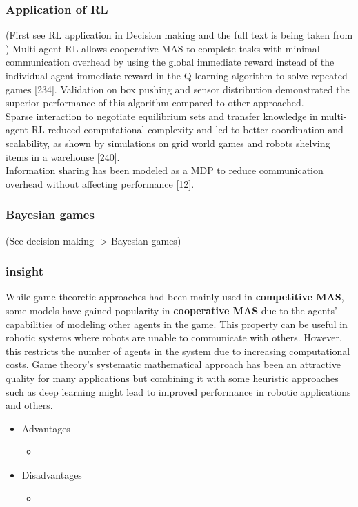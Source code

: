 \documentclass{article}
\begin{document}
			\subsubsection{Application of RL}
			(First see RL application in Decision making and the full text is being taken from \cite{rizk-2019-cooperative-heterogeneous-multi-robot-systems-a-survey}) Multi-agent RL allows cooperative MAS to complete tasks with minimal communication overhead by using the global immediate reward instead of the individual agent immediate reward in the Q-learning algorithm to solve repeated games \cite{rizk-2019-cooperative-heterogeneous-multi-robot-systems-a-survey}[234]. Validation on box pushing and sensor distribution demonstrated the superior performance of this algorithm compared to other approached. 
			\\
			Sparse interaction to negotiate equilibrium sets and transfer knowledge in multi-agent RL reduced computational complexity and led to better coordination and scalability, as shown by simulations on grid world games and robots shelving items in a warehouse \cite{rizk-2019-cooperative-heterogeneous-multi-robot-systems-a-survey}[240]. 
			\\
			Information sharing has been modeled as a MDP to reduce communication overhead without affecting performance \cite{rizk-2019-cooperative-heterogeneous-multi-robot-systems-a-survey}[12].
			
			
			\subsubsection{Bayesian games}
				(See decision-making -> Bayesian games)
				  
			\subsubsection{insight} While game theoretic approaches had been mainly used in \textbf{competitive MAS}, some models have gained popularity in \textbf{cooperative MAS} due to the agents’ capabilities of modeling other agents in the game. This property can be useful in robotic systems where robots are unable to communicate with others. However, this restricts the number of agents in the system due to increasing computational costs. Game theory’s systematic mathematical approach has been an attractive quality for many applications but combining it with some heuristic approaches such as deep learning might lead to improved performance in robotic applications and others.
			\begin{itemize}
				\item Advantages
					\begin{itemize}
						\item 
					\end{itemize}
				\item Disadvantages
					\begin{itemize}
						\item 
					\end{itemize}
			\end{itemize}
		
\end{document}
